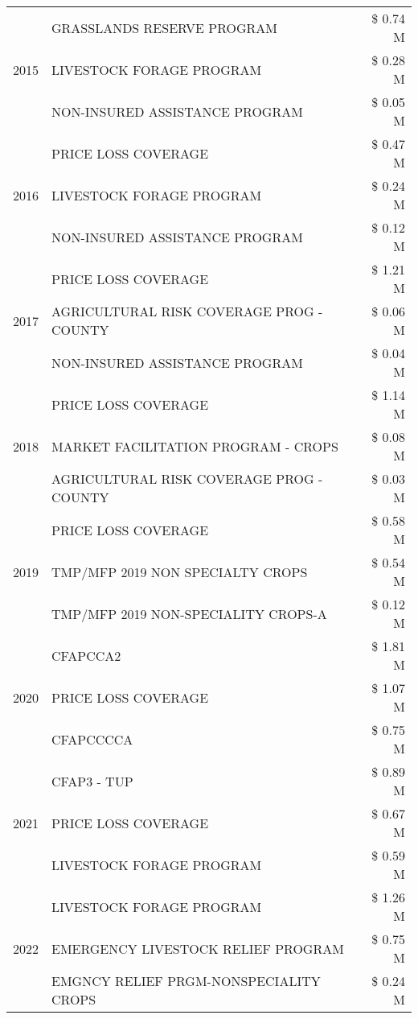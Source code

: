 \begin{tabular}{llr}
\cline{1-3}
\multirow[t]{3}{*}{2015} & GRASSLANDS RESERVE PROGRAM & \$ 0.74 M \\
 & LIVESTOCK FORAGE PROGRAM & \$ 0.28 M \\
 & NON-INSURED ASSISTANCE PROGRAM & \$ 0.05 M \\
\cline{1-3}
\multirow[t]{3}{*}{2016} & PRICE LOSS COVERAGE & \$ 0.47 M \\
 & LIVESTOCK FORAGE PROGRAM & \$ 0.24 M \\
 & NON-INSURED ASSISTANCE PROGRAM & \$ 0.12 M \\
\cline{1-3}
\multirow[t]{3}{*}{2017} & PRICE LOSS COVERAGE & \$ 1.21 M \\
 & AGRICULTURAL RISK COVERAGE PROG - COUNTY & \$ 0.06 M \\
 & NON-INSURED ASSISTANCE PROGRAM & \$ 0.04 M \\
\cline{1-3}
\multirow[t]{3}{*}{2018} & PRICE LOSS COVERAGE & \$ 1.14 M \\
 & MARKET FACILITATION PROGRAM - CROPS & \$ 0.08 M \\
 & AGRICULTURAL RISK COVERAGE PROG - COUNTY & \$ 0.03 M \\
\cline{1-3}
\multirow[t]{3}{*}{2019} & PRICE LOSS COVERAGE & \$ 0.58 M \\
 & TMP/MFP 2019 NON SPECIALTY CROPS & \$ 0.54 M \\
 & TMP/MFP 2019 NON-SPECIALITY CROPS-A & \$ 0.12 M \\
\cline{1-3}
\multirow[t]{3}{*}{2020} & CFAPCCA2 & \$ 1.81 M \\
 & PRICE LOSS COVERAGE & \$ 1.07 M \\
 & CFAPCCCCA & \$ 0.75 M \\
\cline{1-3}
\multirow[t]{3}{*}{2021} & CFAP3 - TUP & \$ 0.89 M \\
 & PRICE LOSS COVERAGE & \$ 0.67 M \\
 & LIVESTOCK FORAGE PROGRAM & \$ 0.59 M \\
\cline{1-3}
\multirow[t]{3}{*}{2022} & LIVESTOCK FORAGE PROGRAM & \$ 1.26 M \\
 & EMERGENCY LIVESTOCK RELIEF PROGRAM & \$ 0.75 M \\
 & EMGNCY RELIEF PRGM-NONSPECIALITY CROPS & \$ 0.24 M \\
\cline{1-3}
\bottomrule
\end{tabular}
